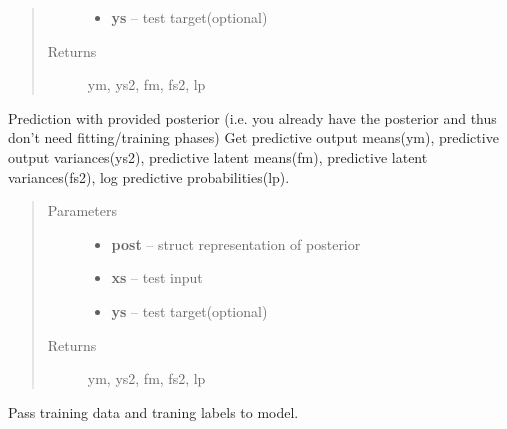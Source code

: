 \documentclass[letterpaper,10pt,english]{sphinxmanual}
\begin{document}
\begin{fulllineitems}
\begin{fulllineitems}
\begin{quote}
\begin{description}
\begin{itemize}
\item {} 
\textbf{ys} -- test target(optional)

\end{itemize}

\item[{Returns}] \leavevmode
ym, ys2, fm, fs2, lp

\end{description}\end{quote}

\end{fulllineitems}


\begin{fulllineitems}
\label{pyGPs.Core:pyGPs.Core.gp.GP.predict_with_posterior}
Prediction with provided posterior
(i.e. you already have the posterior and thus don't need fitting/training phases)
Get predictive output means(ym), 
predictive output variances(ys2),
predictive latent means(fm),
predictive latent variances(fs2),
log predictive probabilities(lp).
\begin{quote}\begin{description}
\item[{Parameters}] \leavevmode\begin{itemize}
\item {} 
\textbf{post} -- struct representation of posterior

\item {} 
\textbf{xs} -- test input

\item {} 
\textbf{ys} -- test target(optional)

\end{itemize}

\item[{Returns}] \leavevmode
ym, ys2, fm, fs2, lp

\end{description}\end{quote}

\end{fulllineitems}


\begin{fulllineitems}
\label{pyGPs.Core:pyGPs.Core.gp.GP.setData}
Pass training data and traning labels to model.


\end{fulllineitems}
\end{fulllineitems}
\end{document}

